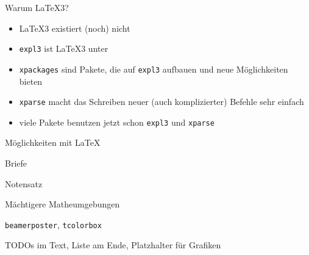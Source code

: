 \begin{frame}[t]
  \centering
\end{frame}

\begin{frame}{Warum \LaTeX3?}
  \begin{itemize}
    \item \LaTeX3 existiert (noch) nicht
    \item \texttt{expl3} ist \LaTeX3 unter \LaTeXe
    \item \texttt{xpackages} sind Pakete, die auf \texttt{expl3} aufbauen und neue Möglichkeiten bieten
    \item \texttt{xparse} macht das Schreiben neuer (auch komplizierter) Befehle sehr einfach
    \item viele Pakete benutzen jetzt schon \texttt{expl3} und \texttt{xparse}
  \end{itemize}
\end{frame}

\begin{frame}[fragile]{Möglichkeiten mit \LaTeX}
  \begin{description}
    \item[\href{http://mirrors.ctan.org/macros/latex/contrib/koma-script/doc/scrguide.pdf}{\texttt{scrlettr2}}] Briefe
    \item[\href{http://mirrors.ctan.org/macros/musixtex/doc/musixdoc.pdf}{MusiXTeX}, \href{http://www.lilypond.org/}{Lilypond}] Notensatz
    \item[\texttt{IEEEtrantools}] Mächtigere Matheumgebungen
    \item[Poster] \texttt{beamerposter}, \texttt{tcolorbox}
    \item[todonotes] TODOs im Text, Liste am Ende, Platzhalter für Grafiken
  \end{description}
\end{frame}

